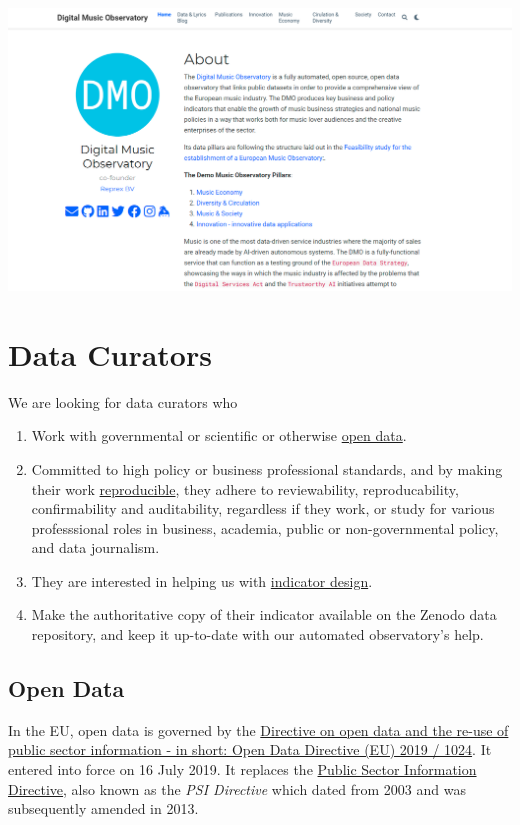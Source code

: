 \documentclass[
  a4paper,
  openany, a4paper, oneside]{book}
\providecommand{\tightlist}{%
  \setlength{\itemsep}{0pt}\setlength{\parskip}{0pt}}
\begin{document}
\begin{center}\includegraphics[width=0.8\linewidth]{plots/dmo_opening_page} \end{center}

\hypertarget{data-curators}{%
\chapter{Data Curators}\label{data-curators}}

We are looking for data curators who

\begin{enumerate}
\def\labelenumi{\arabic{enumi}.}
\tightlist
\item
  Work with governmental or scientific or otherwise \protect\hyperlink{open-data}{open data}.
\item
  Committed to high policy or business professional standards, and by making their work \protect\hyperlink{reproducible-research}{reproducible}, they adhere to reviewability, reproducability, confirmability and auditability, regardless if they work, or study for various professsional roles in business, academia, public or non-governmental policy, and data journalism.
\item
  They are interested in helping us with \protect\hyperlink{indicator-design}{indicator design}.
\item
  Make the authoritative copy of their indicator available on the Zenodo data repository, and keep it up-to-date with our automated observatory's help.
\end{enumerate}

\hypertarget{open-data}{%
\section{Open Data}\label{open-data}}

In the EU, open data is governed by the \href{https://eur-lex.europa.eu/legal-content/EN/TXT/?qid=1561563110433\&uri=CELEX:32019L1024}{Directive on open data and the re-use of public sector information - in short: Open Data Directive (EU) 2019 / 1024}. It entered into force on 16 July 2019. It replaces the \href{https://eur-lex.europa.eu/legal-content/en/ALL/?uri=CELEX:32003L0098}{Public Sector Information Directive}, also known as the \emph{PSI Directive} which dated from 2003 and was subsequently amended in 2013.
\end{document}

